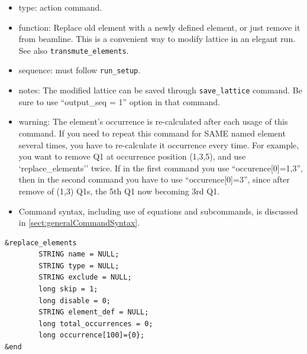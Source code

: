 \documentclass[11pt]{article}
\begin{document}
\begin{itemize}
\item type: action command.
\item function: Replace old element with a newly defined element, or just 
   remove it from beamline. This is a convenient way to modify lattice in an elegant run.
   See also \verb|transmute_elements|.
\item sequence: must follow \verb|run_setup|.
\item notes: 
	The modified lattice can be saved through \verb|save_lattice|
   command. Be sure to use ``output\_seq = 1'' option in that command.  
\item warning:
   The element's occurrence is re-calculated after each usage of this command. If 
   you need to repeat this command for SAME named element several times, you have to re-calculate 
   it occurrence every time. For example, you want to remove Q1 at occurrence position 
   (1,3,5), and use 
   `replace\_elements'' twice. If in the first command you use ``occurence[0]=1,3'',
   then in the second command you have to use ``occurence[0]=3'', since after remove of
   (1,3) Q1s, the 5th Q1 now becoming 3rd Q1.
\item Command syntax, including use of equations and subcommands, is discussed in \ref{sect:generalCommandSyntax}.
\end{itemize}

\begin{verbatim}
&replace_elements
        STRING name = NULL;
        STRING type = NULL;
        STRING exclude = NULL;
        long skip = 1;
        long disable = 0;
        STRING element_def = NULL;
        long total_occurrences = 0;
        long occurrence[100]={0};
&end
\end{verbatim}
\end{document}
